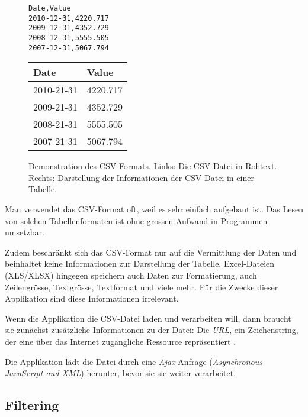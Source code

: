 \begin{figure}[!htbp]
	\centering
	\begin{minipage}{0.5\textwidth}
		\centering
		\begin{verbatim}
Date,Value
2010-12-31,4220.717
2009-12-31,4352.729
2008-12-31,5555.505
2007-12-31,5067.794
		\end{verbatim}
	\end{minipage}\hfill
	\begin{minipage}{0.5\textwidth}
		\centering
		\begin{tabular}{ | l | l |}
			\hline
			\textbf{Date} & \textbf{Value} \\ \hline
			2010-21-31 & 4220.717 \\ \hline
			2009-21-31 & 4352.729 \\ \hline
			2008-21-31 & 5555.505 \\ \hline
			2007-21-31 & 5067.794 \\ \hline
		\end{tabular}
	\end{minipage}
	\caption[Demonstration des CSV-Formats]{Demonstration des CSV-Formats. Links: Die CSV-Datei in Rohtext. Rechts: Darstellung der Informationen der CSV-Datei in einer Tabelle.}
	\label{fig:csv}
\end{figure}

Man verwendet das CSV-Format oft, weil es sehr einfach aufgebaut ist. Das Lesen von solchen Tabellenformaten ist ohne grossen Aufwand in Programmen umsetzbar. 

Zudem beschränkt sich das CSV-Format nur auf die Vermittlung der Daten und beinhaltet keine Informationen zur Darstellung der Tabelle. Excel-Dateien (XLS/XLSX) hingegen speichern auch Daten zur Formatierung, auch Zeilengrösse, Textgrösse, Textformat und viele mehr. Für die Zwecke dieser Applikation sind diese Informationen irrelevant.
 
 
Wenn die Applikation die CSV-Datei laden und verarbeiten will, dann braucht sie zunächst zusätzliche Informationen zu der Datei: Die \textit{URL}, ein Zeichenstring, der eine über das Internet zugängliche Ressource repräsentiert \cite{url}.

Die Applikation lädt die Datei durch eine \textit{Ajax}-Anfrage (\textit{Asynchronous JavaScript and XML}) herunter, bevor sie sie weiter verarbeitet.

\subsection{Filtering}

